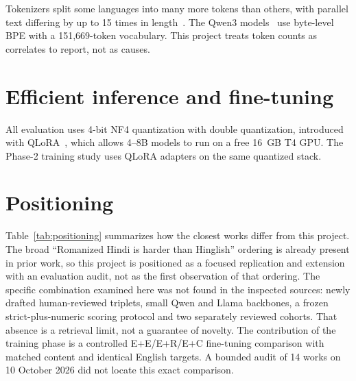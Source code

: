 \documentclass[12pt,a4paper,oneside]{report}
\renewcommand{\_}{\oldunderscore\allowbreak}
\begin{document}
Tokenizers split some languages into many more tokens than others, with parallel text differing by up to 15 times in length~\citep{petrov-etal-2023-tokenizers}. The Qwen3 models~\citep{qwen3-2025} use byte-level BPE with a 151,669-token vocabulary. This project treats token counts as correlates to report, not as causes.

\section{Efficient inference and fine-tuning}

All evaluation uses 4-bit NF4 quantization with double quantization, introduced with QLoRA~\citep{dettmers-etal-2023-qlora}, which allows 4--8B models to run on a free 16~GB T4 GPU. The Phase-2 training study uses QLoRA adapters on the same quantized stack.

\section{Positioning}

Table~\ref{tab:positioning} summarizes how the closest works differ from this project. The broad ``Romanized Hindi is harder than Hinglish'' ordering is already present in prior work, so this project is positioned as a focused replication and extension with an evaluation audit, not as the first observation of that ordering. The specific combination examined here was not found in the inspected sources: newly drafted human-reviewed triplets, small Qwen and Llama backbones, a frozen strict-plus-numeric scoring protocol and two separately reviewed cohorts. That absence is a retrieval limit, not a guarantee of novelty. The contribution of the training phase is a controlled E+E/E+R/E+C fine-tuning comparison with matched content and identical English targets. A bounded audit of 14 works on 10 October 2026 did not locate this exact comparison.
\end{document}
